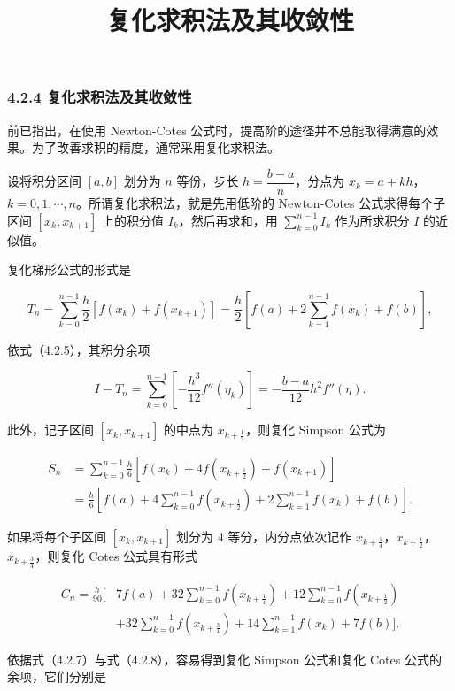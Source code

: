 \documentclass[
  10pt,
  fontset=fandol]{ctexart}
\title{复化求积法及其收敛性}
\author{}
\date{}
\begin{document}
\maketitle

\subsubsection{4.2.4 复化求积法及其收敛性}\label{ux590dux5316ux6c42ux79efux6cd5ux53caux5176ux6536ux655bux6027}

前已指出，在使用 Newton-Cotes 公式时，提高阶的途径并不总能取得满意的效果。为了改善求积的精度，通常采用复化求积法。

设将积分区间 \([a,b]\) 划分为 \(n\) 等份，步长 \(h=\dfrac{b-a}{n}\)，分点为 \(x_k=a+kh\)，\(k=0,1,\cdots,n\)。所谓复化求积法，就是先用低阶的 Newton-Cotes 公式求得每个子区间 \([x_k,x_{k+1}]\) 上的积分值 \(I_k\)，然后再求和，用 \(\displaystyle\sum_{k=0}^{n-1}I_k\) 作为所求积分 \(I\) 的近似值。

复化梯形公式的形式是

\[
T_n=\sum_{k=0}^{n-1}\frac h2[f(x_k)+f(x_{k+1})]
=\frac h2\left[f(a)+2\sum_{k=1}^{n-1}f(x_k)+f(b)\right],
\tag{4.2.9}
\]

依式（4.2.5），其积分余项

\[
I-T_n=\sum_{k=0}^{n-1}\left[-\frac{h^3}{12}f''(\eta_k)\right]
=-\frac{b-a}{12}h^2f''(\eta).
\tag{4.2.10}
\]

此外，记子区间 \([x_k,x_{k+1}]\) 的中点为 \(x_{k+\frac12}\)，则复化 Simpson 公式为

\[
\begin{aligned}
S_n&=\sum_{k=0}^{n-1}\frac h6[f(x_k)+4f(x_{k+\frac12})+f(x_{k+1})]\\
&=\frac h6\left[f(a)+4\sum_{k=0}^{n-1}f(x_{k+\frac12})+2\sum_{k=1}^{n-1}f(x_k)+f(b)\right].
\end{aligned}
\tag{4.2.11}
\]

如果将每个子区间 \([x_k,x_{k+1}]\) 划分为 4 等分，内分点依次记作 \(x_{k+\frac14}\)，\(x_{k+\frac12}\)，\(x_{k+\frac34}\)，则复化 Cotes 公式具有形式

\[
\begin{aligned}
C_n=\frac h{90}\biggl[&7f(a)+32\sum_{k=0}^{n-1}f(x_{k+\frac14})+12\sum_{k=0}^{n-1}f(x_{k+\frac12})\\
&+32\sum_{k=0}^{n-1}f(x_{k+\frac34})+14\sum_{k=1}^{n-1}f(x_k)+7f(b)\biggr].
\end{aligned}
\tag{4.2.12}
\]

依据式（4.2.7）与式（4.2.8），容易得到复化 Simpson 公式和复化 Cotes 公式的余项，它们分别是
\end{document}
